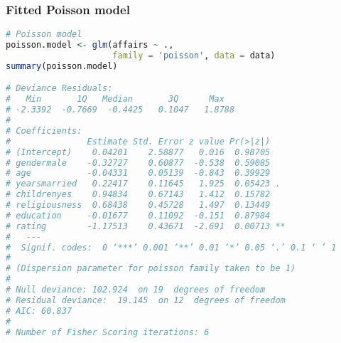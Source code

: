 \documentclass[border=5mm, convert, usenames, dvipsnames,beamer]{standalone}
\begin{document}
\begin{frame}[ fragile]{}
\frametitle{Fitted Poisson model}
\vspace{30}
\noindent

\tiny
\begin{lstlisting}[language=R]
# Poisson model
poisson.model <- glm(affairs ~ .,
                     family = 'poisson', data = data)
summary(poisson.model)

# Deviance Residuals: 
#   Min       1Q   Median       3Q      Max  
# -2.3392  -0.7669  -0.4425   0.1047   1.8788  
# 
# Coefficients:
#               Estimate Std. Error z value Pr(>|z|)   
# (Intercept)    0.04201    2.58877   0.016  0.98705   
# gendermale    -0.32727    0.60877  -0.538  0.59085   
# age           -0.04331    0.05139  -0.843  0.39929   
# yearsmarried   0.22417    0.11645   1.925  0.05423 . 
# childrenyes    0.94834    0.67143   1.412  0.15782   
# religiousness  0.68438    0.45728   1.497  0.13449   
# education     -0.01677    0.11092  -0.151  0.87984   
# rating        -1.17513    0.43671  -2.691  0.00713 **
#   ---
#  Signif. codes:  0 ‘***’ 0.001 ‘**’ 0.01 ‘*’ 0.05 ‘.’ 0.1 ‘ ’ 1
# 
# (Dispersion parameter for poisson family taken to be 1)
# 
# Null deviance: 102.924  on 19  degrees of freedom
# Residual deviance:  19.145  on 12  degrees of freedom
# AIC: 60.837
# 
# Number of Fisher Scoring iterations: 6
\end{lstlisting}
\end{frame}
\end{document}
